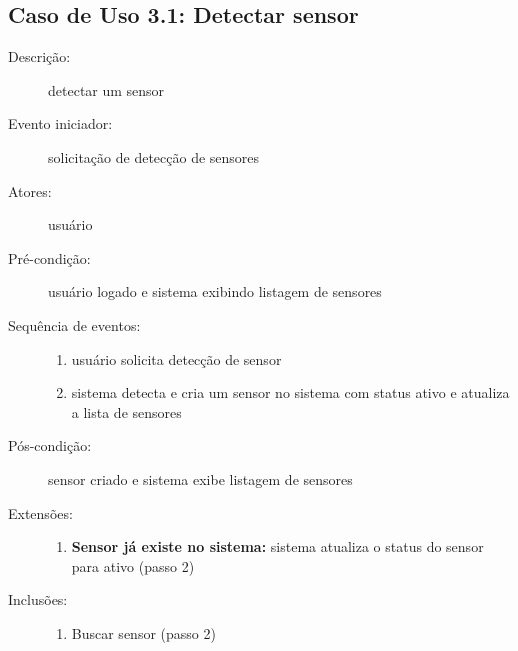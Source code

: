 \subsection{Caso de Uso 3.1: Detectar sensor}
\begin{description}
	\item[Descrição:] detectar um sensor
	\item[Evento iniciador:] solicitação de detecção de sensores
	\item[Atores:] usuário
	\item[Pré-condição:] usuário logado e sistema exibindo listagem de sensores
	\item[Sequência de eventos:] \hfill
		\begin{enumerate}
			\item{usuário solicita detecção de sensor}
			\item{sistema detecta e cria um sensor no sistema com status ativo e atualiza a lista de sensores}
		\end{enumerate}
	\item[Pós-condição:] sensor criado e sistema exibe listagem de sensores
	\item[Extensões:] \hfill
		\begin{enumerate}
			\item{\textbf{Sensor já existe no sistema:} sistema atualiza o status do sensor para ativo (passo 2)}
		\end{enumerate}
	\item[Inclusões:] \hfill
		\begin{enumerate}
			\item{Buscar sensor (passo 2)}
		\end{enumerate}
\end{description}
%
